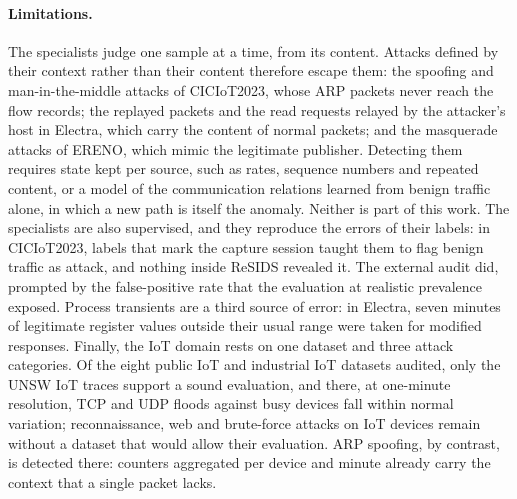 
\paragraph{Limitations.}
The specialists judge one sample at a time, from its content. Attacks defined by their
context rather than their content therefore escape them: the spoofing and
man-in-the-middle attacks of CICIoT2023, whose ARP packets never reach the flow records;
the replayed packets and the read requests relayed by the attacker's host in Electra,
which carry the content of normal packets; and the masquerade attacks of ERENO, which
mimic the legitimate publisher. Detecting them requires state kept per source, such as
rates, sequence numbers and repeated content, or a model of the communication relations
learned from benign traffic alone, in which a new path is itself the anomaly. Neither is
part of this work. The specialists are also supervised, and they reproduce the errors of
their labels: in CICIoT2023, labels that mark the capture session taught them to flag
benign traffic as attack, and nothing inside ReSIDS revealed it. The external audit did,
prompted by the false-positive rate that the evaluation at realistic prevalence exposed.
Process transients are a third source of error: in Electra, seven minutes of legitimate
register values outside their usual range were taken for modified responses. Finally, the IoT
domain rests on one dataset and three attack categories. Of the eight public IoT and
industrial IoT datasets audited, only the UNSW IoT traces support a sound evaluation, and
there, at one-minute resolution, TCP and UDP floods against busy devices fall within normal
variation; reconnaissance, web and brute-force attacks on IoT devices remain without a
dataset that would allow their evaluation. ARP spoofing, by contrast, is detected there:
counters aggregated per device and minute already carry the context that a single packet
lacks.
